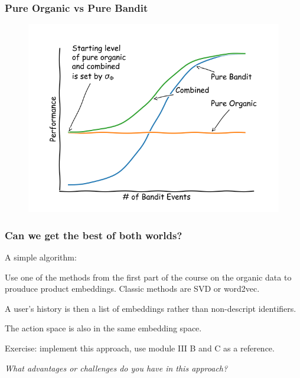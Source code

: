 

\begin{frame}
  \frametitle{Pure Organic vs Pure Bandit}
\begin{figure}[h!]
\includegraphics[scale=0.45]{images/pureorganicpurebandit.png}
\centering
\end{figure}
\end{frame}






\begin{frame}
  \frametitle{Can we get the best of both worlds?}

A simple algorithm:

\pause
Use one of the methods from the first part of the course on the organic data to prouduce product embeddings.  Classic methods are SVD or word2vec.

\pause

A user's history is then a list of embeddings rather than non-descript identifiers.

\pause

The action space is also in the same embedding space.

\pause

Exercise: implement this approach, use module III B and C as a reference.

\pause

\emph{What advantages or challenges do you have in this approach?}
\end{frame}
